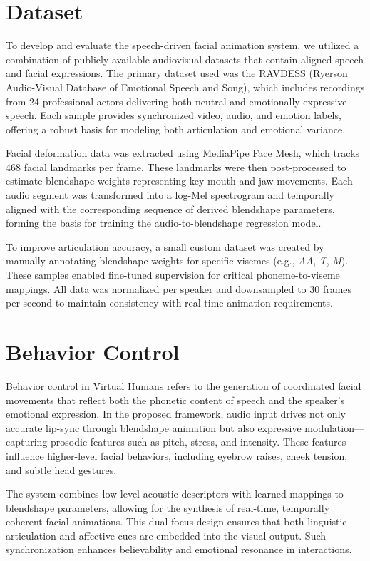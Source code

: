 \documentclass[runningheads]{llncs}
\begin{document}
\section{Dataset}

To develop and evaluate the speech-driven facial animation system, we utilized a combination of publicly available audiovisual datasets that contain aligned speech and facial expressions. The primary dataset used was the RAVDESS (Ryerson Audio-Visual Database of Emotional Speech and Song), which includes recordings from 24 professional actors delivering both neutral and emotionally expressive speech. Each sample provides synchronized video, audio, and emotion labels, offering a robust basis for modeling both articulation and emotional variance.

Facial deformation data was extracted using MediaPipe Face Mesh, which tracks 468 facial landmarks per frame. These landmarks were then post-processed to estimate blendshape weights representing key mouth and jaw movements. Each audio segment was transformed into a log-Mel spectrogram and temporally aligned with the corresponding sequence of derived blendshape parameters, forming the basis for training the audio-to-blendshape regression model.

To improve articulation accuracy, a small custom dataset was created by manually annotating blendshape weights for specific visemes (e.g., \textit{AA}, \textit{T}, \textit{M}). These samples enabled fine-tuned supervision for critical phoneme-to-viseme mappings. All data was normalized per speaker and downsampled to 30 frames per second to maintain consistency with real-time animation requirements.


\section{Behavior Control}

Behavior control in Virtual Humans refers to the generation of coordinated facial movements that reflect both the phonetic content of speech and the speaker’s emotional expression. In the proposed framework, audio input drives not only accurate lip-sync through blendshape animation but also expressive modulation—capturing prosodic features such as pitch, stress, and intensity. These features influence higher-level facial behaviors, including eyebrow raises, cheek tension, and subtle head gestures.

The system combines low-level acoustic descriptors with learned mappings to blendshape parameters, allowing for the synthesis of real-time, temporally coherent facial animations. This dual-focus design ensures that both linguistic articulation and affective cues are embedded into the visual output. Such synchronization enhances believability and emotional resonance in interactions.
\end{document}
